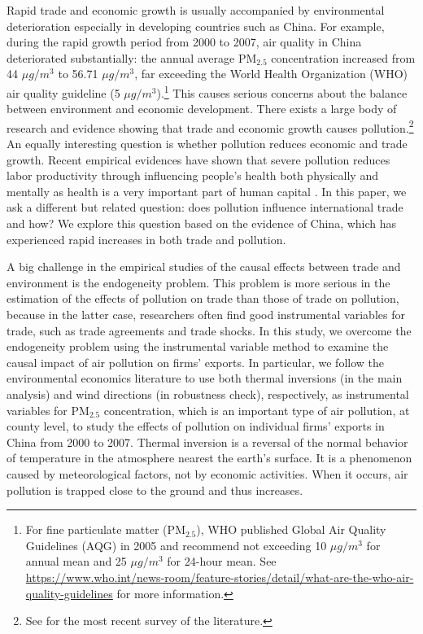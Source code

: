\documentclass[12pt]{article}
\begin{document}
\label{sec:1} Rapid trade and economic growth is usually accompanied by
environmental deterioration especially in developing countries such as
China. For example, during the rapid growth period from 2000 to 2007, air quality in China deteriorated substantially:
 the annual average $\mathrm{PM_{2.5}}$
concentration increased from 44 $\mu g/m^{3}$ to 56.71 $\mu g/m^{3}$, far exceeding the World Health Organization
(WHO) air quality
guideline (5 $\mu g/m^{3}$).\footnote{%
For fine particulate matter ($\mathrm{PM_{2.5}}$), WHO published Global Air Quality Guidelines (AQG) in 2005 and recommend not exceeding 10 $\mu g/m^{3}$ for annual mean and 25 $\mu g/m^{3}$ for 24-hour mean.
See %
\url{https://www.who.int/news-room/feature-stories/detail/what-are-the-who-air-quality-guidelines}
for more information.} This causes serious
concerns about the balance between environment and economic development. There exists
a large body of research and evidence showing that trade and economic growth causes
pollution.\footnote{%
See \cite{cherniwchan2017trade} for the most recent survey of the literature.%
} An equally interesting question is whether pollution reduces economic and
trade growth. Recent empirical evidences have shown that severe pollution
reduces labor productivity through influencing people's health both
physically and mentally as health is a very important part of human capital %
\citep{graff2012impact,chang2016particulate,zhang2018impact,fu2021air,somanathan2021impact,adhvaryu2022management}%
. In this paper, we ask a different but related question: does pollution
influence international trade and how? We explore this question based on the
evidence of China, which has experienced rapid increases in both trade and
pollution.

A big challenge in the empirical studies of the causal effects between trade
and environment is the endogeneity problem. This problem is more serious in
the estimation of the effects of pollution on trade than those of trade on
pollution, because in the latter case, researchers often find good
instrumental variables for trade, such as trade agreements and trade shocks.
In this study, we overcome the endogeneity problem using the instrumental
variable method to examine the causal impact of air pollution on firms'
exports. In particular, we follow the environmental economics literature 
\citep{fu2021air,
fu2021trans,NBERw28401,chen2022effect} to use both thermal inversions (in
the main analysis) and wind directions (in robustness check), respectively,
as instrumental variables for $\mathrm{PM_{2.5}}$ concentration, which is an
important type of air pollution, at county level, to study the effects of
pollution on individual firms' exports in China from 2000 to 2007. Thermal
inversion is a reversal of the normal behavior of temperature in the
atmosphere nearest the earth's surface. It is a phenomenon caused by
meteorological factors, not by economic activities. When it occurs, air
pollution is trapped close to the ground and thus increases.
\end{document}
